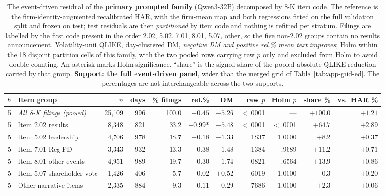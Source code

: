 \begin{table}[p]
\centering
\caption[The 8-K residual by item code, primary family]{The event-driven
residual of the \textbf{primary prompted family} (Qwen3-32B) decomposed by
8-K item code. The reference is the firm-identity-augmented recalibrated
HAR, with the firm-mean map and both regressions fitted on the full
validation split and frozen on test; test residuals are then
\emph{partitioned} by item code and nothing is refitted per stratum.
Filings are labelled by the first code present in the order 2.02, 5.02,
7.01, 8.01, 5.07, other, so the five non-2.02 groups contain no results
announcement. Volatility-unit QLIKE, day-clustered DM, \emph{negative DM
and positive rel.\% mean text improves}; Holm within the 18 disjoint
partition cells of this family, with the two pooled rows carrying raw $p$
only and excluded from Holm to avoid double counting. An asterisk marks
Holm significance. ``share'' is the signed share of the pooled absolute
QLIKE reduction carried by that group. \textbf{Support: the full
event-driven panel}, wider than the merged grid of
Table~\ref{tab:app-grid-ed}. The percentages are not interchangeable across
the two supports.}
\label{tab:app-item-qwen}
\singlespacing\footnotesize
\setlength{\tabcolsep}{3.5pt}
\begin{tabular}{@{}rlrrrrrrrrr@{}}
\toprule
$h$ & Item group & $n$ & days & \% filings & rel.\% & DM & raw $p$ & Holm $p$ & share \% & vs.\ HAR \% \\
\midrule
5 & \emph{All 8-K filings (pooled)} & 25{,}109 & 996 & 100.0 & $+0.45$\phantom{*} & $-5.26$ & $<$.0001 & --- & $+100.0$ & $+1.21$ \\
5 & Item 2.02 results & 8{,}348 & 821 & 33.2 & $+0.99$* & $-5.48$ & $<$.0001 & $<$.0001 & $+64.7$ & $+2.89$ \\
5 & Item 5.02 leadership & 4{,}706 & 978 & 18.7 & $+0.18$\phantom{*} & $-1.33$ & .1837 & 1.0000 & $+8.2$ & $+0.37$ \\
5 & Item 7.01 Reg-FD & 3{,}343 & 932 & 13.3 & $+0.38$\phantom{*} & $-1.48$ & .1384 & .9689 & $+11.2$ & $+0.71$ \\
5 & Item 8.01 other events & 4{,}951 & 989 & 19.7 & $+0.30$\phantom{*} & $-1.74$ & .0821 & .6564 & $+13.9$ & $+0.86$ \\
5 & Item 5.07 shareholder vote & 1{,}426 & 406 & 5.7 & $-0.02$\phantom{*} & $+0.52$ & .6019 & 1.0000 & $-0.3$ & $+0.20$ \\
5 & Other narrative items & 2{,}335 & 884 & 9.3 & $+0.11$\phantom{*} & $-0.29$ & .7686 & 1.0000 & $+2.3$ & $+0.06$ \\

\end{tabular}
\end{table}
